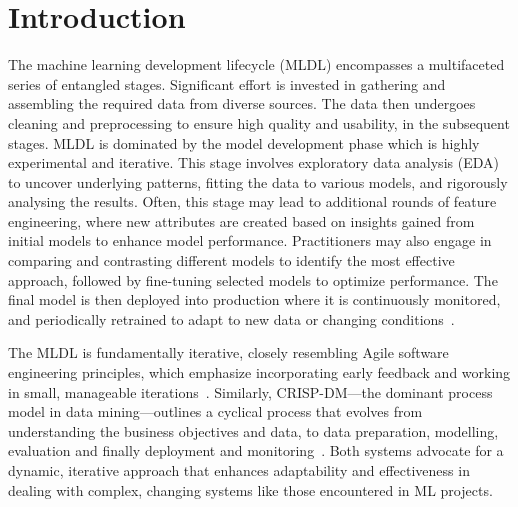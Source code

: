 \documentclass[smallextended]{svjour3}       %
\providecommand{\DIFdelbegin}{} %
\providecommand{\DIFdelend}{} %
\newcommand{\DIFscaledelfig}{0.5}
\newlength{\DIFdelgraphicswidth} %
\newlength{\DIFdelgraphicsheight} %
\newcommand{\DIFdelincludegraphics}[2][]{%
\sbox{\DIFdelgraphicsbox}{\DIFOincludegraphics[#1]{#2}}%
\settoboxwidth{\DIFdelgraphicswidth}{\DIFdelgraphicsbox} %
\settoboxtotalheight{\DIFdelgraphicsheight}{\DIFdelgraphicsbox} %
\scalebox{\DIFscaledelfig}{%
\parbox[b]{\DIFdelgraphicswidth}{\usebox{\DIFdelgraphicsbox}\\[-\baselineskip] \rule{\DIFdelgraphicswidth}{0em}}\llap{\resizebox{\DIFdelgraphicswidth}{\DIFdelgraphicsheight}{%
\setlength{\unitlength}{\DIFdelgraphicswidth}%
\begin{picture}(1,1)%
\thicklines\linethickness{2pt} %
{\color[rgb]{1,0,0}\put(0,0){\framebox(1,1){}}}%
{\color[rgb]{1,0,0}\put(0,0){\line( 1,1){1}}}%
{\color[rgb]{1,0,0}\put(0,1){\line(1,-1){1}}}%
\end{picture}%
}\hspace*{3pt}}} %
} %
\DeclareRobustCommand{\DIFdelbegin}{\DIFOdelbegin \let\includegraphics\DIFdelincludegraphics} %
\DeclareRobustCommand{\DIFdelend}{\DIFOaddend \let\includegraphics\DIFOincludegraphics} %
\begin{document}

\section{Introduction}
\DIFdelbegin %

\DIFdelend The machine learning development lifecycle (MLDL) encompasses a multifaceted series of entangled stages. Significant effort is invested in gathering and assembling the required data from diverse sources. The data then undergoes cleaning and preprocessing to ensure high quality and usability, in the subsequent stages. MLDL is dominated by the model development phase which is highly experimental and iterative. This stage involves exploratory data analysis (EDA) to uncover underlying patterns, fitting the data to various models, and rigorously analysing the results. Often, this stage may lead to additional rounds of feature engineering, where new attributes are created based on insights gained from initial models to enhance model performance. Practitioners may also engage in comparing and contrasting different models to identify the most effective approach, followed by fine-tuning selected models to optimize performance. The final model is then deployed into production where it is continuously monitored, and periodically retrained to adapt to new data or changing conditions~\citep{haakman2021ai,amershi2019software,sculley2015hidden}.

The MLDL is fundamentally iterative, closely resembling Agile software engineering principles, which emphasize incorporating early feedback and working in small, manageable iterations~\citep{betz2018managing}. Similarly, CRISP-DM---the dominant process model in data mining---outlines a cyclical process that evolves from understanding the business objectives and data, to data preparation, modelling, evaluation and finally deployment and monitoring~\citep{martinez-plumed2021crisp-dm}. Both systems advocate for a dynamic, iterative approach that enhances adaptability and effectiveness in dealing with complex, changing systems like those encountered in ML projects.
\end{document}
